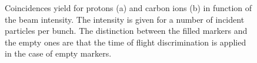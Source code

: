 \documentclass[12pt]{iopart}
\begin{document}
\begin{figure} [!h]
\caption{Coincidences yield for protons (a) and carbon ions (b) in function of the beam intensity. The intensity is given for a number of incident particles per bunch.  The distinction between the filled markers and the empty ones are that the time of flight discrimination is applied in the case of empty markers.}
  \label{fig:coincidences}
\end{figure}
\end{document}
